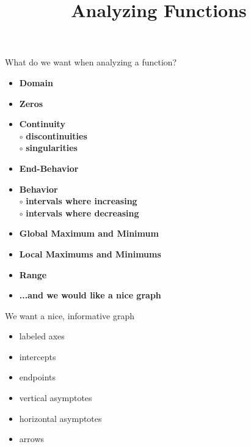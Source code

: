 \documentclass{ximera}
\title{Analyzing Functions}
\begin{document}
\begin{abstract}
%
\end{abstract}
\maketitle






What do we want when analyzing a function?



\begin{itemize}
     \item \textbf{\textcolor{red!70!black}{Domain}} 
     \item \textbf{\textcolor{red!70!black}{Zeros}} 
     \item \textbf{\textcolor{red!70!black}{Continuity}} \\
     \text{    }$\circ$ \textbf{\textcolor{purple!85!blue}{discontinuities}}\\
     \text{    }$\circ$ \textbf{\textcolor{purple!85!blue}{singularities}}\\
     \item \textbf{\textcolor{red!70!black}{End-Behavior}} 
     \item \textbf{\textcolor{red!70!black}{Behavior}} \\
     \text{    }$\circ$ \textbf{\textcolor{purple!85!blue}{intervals where increasing}}\\
     \text{    }$\circ$ \textbf{\textcolor{purple!85!blue}{intervals where decreasing}}\\
     \item \textbf{\textcolor{red!70!black}{Global Maximum and Minimum}} 
     \item \textbf{\textcolor{red!70!black}{Local Maximums and Minimums}} 
     \item \textbf{\textcolor{red!70!black}{Range}} 
     \item \textbf{\textcolor{blue!55!black}{...and we would like a nice graph}} 
\end{itemize}







We want a nice, informative graph
\begin{itemize}
	\item labeled axes
	\item intercepts
	\item endpoints
	\item vertical asymptotes
	\item horizontal asymptotes
	\item arrows
\end{itemize}
\end{document}

